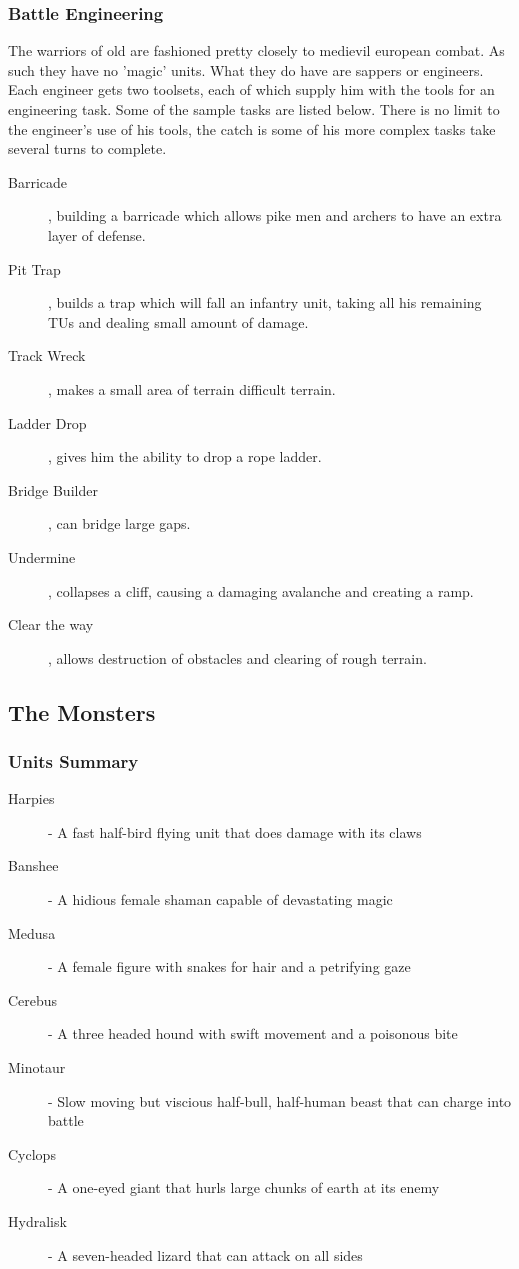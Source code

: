 \documentclass[a4paper,twocolumn]{article}
\begin{document}
\subsubsection{Battle Engineering}

The warriors of old are fashioned pretty closely to medievil european combat. As such they have no 'magic' units. What they do have are sappers or engineers. Each engineer gets two toolsets, each of which supply him with the tools for an engineering task. Some of the sample tasks are listed below. There is no limit to the engineer's use of his tools, the catch is some of his more complex tasks take several turns to complete.

\begin{description}
\item[Barricade], building a barricade which allows pike men and archers to have an extra layer of defense.
\item[Pit Trap], builds a trap which will fall an infantry unit, taking all his remaining TUs and dealing small amount of damage.
\item[Track Wreck], makes a small area of terrain difficult terrain.
\item[Ladder Drop], gives him the ability to drop a rope ladder.
\item[Bridge Builder], can bridge large gaps.
\item[Undermine], collapses a cliff, causing a damaging avalanche and creating a ramp.
\item[Clear the way], allows destruction of obstacles and clearing of rough terrain.
\end{description}

\subsection{The Monsters}

\subsubsection{Units Summary}
\begin{description}
\item [Harpies]- A fast half-bird flying unit that does damage with its claws
\item [Banshee]- A hidious female shaman capable of devastating magic
\item [Medusa]- A female figure with snakes for hair and a petrifying gaze

\item [Cerebus]- A three headed hound with swift movement and a poisonous bite
\item [Minotaur]- Slow moving but viscious half-bull, half-human beast that can charge into battle
\item [Cyclops]- A one-eyed giant that hurls large chunks of earth at its enemy
\item [Hydralisk]- A seven-headed lizard that can attack on all sides
\end{description}
\end{document}
